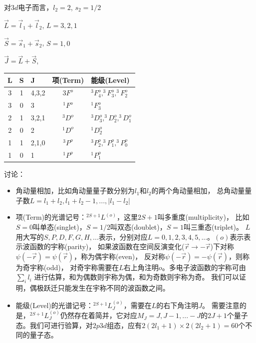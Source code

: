 对$3d$电子而言，$l_2=2$, $s_2=1/2$

$\vec L = \vec l_1 + \vec l_2$, $L = 3,2,1$

$\vec S = \vec s_1 + \vec s_2$, $S = 1, 0$

$\vec J = \vec L + \vec S$,


\begin{center}

\begin{tabular}{|c|c|l|c|l|}
  \hline
  L & S & J & 项(Term) & 能级(Level) \\
\hline

  3 & 1 & 4,3,2 & $3F^o$ & $^3F^o_4, ^3F^o_3, ^3F^o_2$ \\
  3 & 0 & 3 & $^1F^o$ & $^1F^o_3$ \\
  2 & 1 & 3,2,1 & $^3D^o$ & $^3D^o_3,^3D^o_2,^3D^o_1$ \\
  2 & 0 & 2 & $^1D^o$ & $^1D^o_2$ \\
  1 & 1 & 2,1,0 & $^3P^o$ & $^3P^o_2,^3P^o_1,^3P^o_0$ \\
  1 & 0 & 1 & $^1P^o$ & $^1P^o_1$ \\
  \hline
\end{tabular}

\end{center}

讨论：

\begin{itemize}
  \item
  角动量相加，比如角动量量子数分别为$l_1$和$l_2$的两个角动量相加，
  总角动量量子数$L = l_1 + l_2, l_1 + l_2 -1, ..., \left|l_1-l_2\right|$

  \item
  项(Term)的光谱记号：$^{2S+1}L^{(o)}$，这里$2S+1$叫多重度(multiplicity)，
  比如$S=0$叫单态(singlet)，$S=1/2$叫双态(doublet)，$S=1$叫三重态(triplet)。
  $L$用大写的$S,P,D,F,G,H,...$表示，分别对应$L=0,1,2,3,4,5,...$。$(o)$表示表示波函数的宇称(parity)，
  如果波函数在空间反演变化($\vec r \to - \vec
  r$)下对称$\psi(- \vec r) = \psi(\vec r)$，称为偶宇称(even)，
  反对称$\psi(- \vec r) = - \psi(\vec r)$，则称为奇宇称(odd)，
  对奇宇称需要在$L$右上角注明$o$。多电子波函数的宇称可由$\sum \limits_i l_i$
  进行估算，和为偶数则宇称为偶，和为奇数则宇称为奇。
  我们可以证明，偶极跃迁只能发生在宇称不同的波函数之间。

  \item
  能级(Level)的光谱记号：$^{2S+1}L^{(o)}_J$，需要在$L$的右下角注明$J$。
  需要注意的是，$^{2S+1}L^{(o)}_J$仍然存在着简并，它对应$M_J=J,J-1,...
  -J$的$2J+1$个量子态。我们可进行验算，对$2p3d$组态，应有$2(2l_1+1)\times
  2(2l_2+1)=60$个不同的量子态。

\end{itemize}


